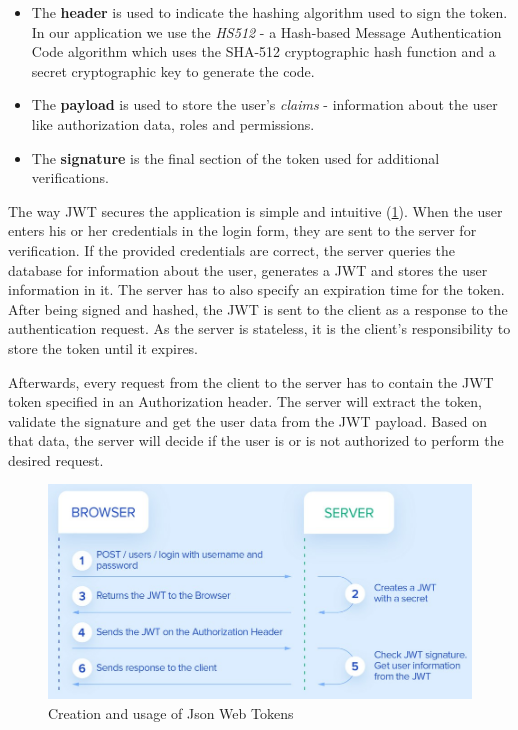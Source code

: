 \begin{itemize}
  \item The \textbf{header} is used to indicate the hashing algorithm used to sign the token. In our application we use the \textit{HS512} - a Hash-based Message Authentication Code algorithm which uses the SHA-512 cryptographic hash function and a secret cryptographic key to generate the code.
  \item The \textbf{payload} is used to store the user's \textit{claims} - information about the user like authorization data, roles and permissions.
  \item The \textbf{signature} is the final section of the token used for additional verifications.
\end{itemize}

The way JWT secures the application is simple and intuitive (\ref{jwtFlow}). When the user enters his or her credentials in the login form, they are sent to the server for verification. If the provided credentials are correct, the server queries the database for information about the user, generates a JWT and stores the user information in it. The server has to also specify an expiration time for the token. After being signed and hashed, the JWT is sent to the client as a response to the authentication request. As the server is stateless, it is the client's responsibility to store the token until it expires.

Afterwards, every request from the client to the server has to contain the JWT token specified in an Authorization header. The server will extract the token, validate the signature and get the user data from the JWT payload. Based on that data, the server will decide if the user is or is not authorized to perform the desired request.

\begin{figure}[H]
  \centering
  \includegraphics[width=4.5in]{images/jwtFlow}
  \caption[Creation and usage of Json Web Tokens]{Creation and usage of Json Web Tokens \footnotemark}
  \label{jwtFlow}
\end{figure}


